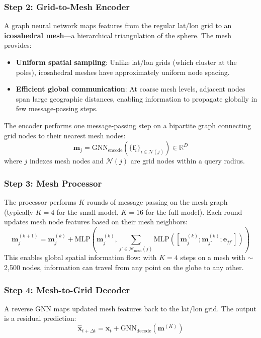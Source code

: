 \documentclass[11pt,a4paper]{article}
\begin{document}
\subsubsection{Step 2: Grid-to-Mesh Encoder}

A graph neural network maps features from the regular lat/lon grid to an \textbf{icosahedral mesh}---a hierarchical triangulation of the sphere. The mesh provides:
\begin{itemize}[nosep]
  \item \textbf{Uniform spatial sampling}: Unlike lat/lon grids (which cluster at the poles), icosahedral meshes have approximately uniform node spacing.
  \item \textbf{Efficient global communication}: At coarse mesh levels, adjacent nodes span large geographic distances, enabling information to propagate globally in few message-passing steps.
\end{itemize}

The encoder performs one message-passing step on a bipartite graph connecting grid nodes to their nearest mesh nodes:
\[
\mathbf{m}_j = \text{GNN}_\text{encode}\left(\{\mathbf{f}_i\}_{i \in \mathcal{N}(j)}\right) \in \mathbb{R}^D
\]
where $j$ indexes mesh nodes and $\mathcal{N}(j)$ are grid nodes within a query radius.

\subsubsection{Step 3: Mesh Processor}

The processor performs $K$ rounds of message passing on the mesh graph (typically $K{=}4$ for the small model, $K{=}16$ for the full model). Each round updates mesh node features based on their mesh neighbors:
\[
\mathbf{m}_j^{(k+1)} = \mathbf{m}_j^{(k)} + \text{MLP}\left(\mathbf{m}_j^{(k)}, \sum_{j' \in \mathcal{N}_\text{mesh}(j)} \text{MLP}([\mathbf{m}_j^{(k)}; \mathbf{m}_{j'}^{(k)}; \mathbf{e}_{jj'}])\right)
\]
This enables global spatial information flow: with $K{=}4$ steps on a mesh with $\sim$2,500 nodes, information can travel from any point on the globe to any other.

\subsubsection{Step 4: Mesh-to-Grid Decoder}

A reverse GNN maps updated mesh features back to the lat/lon grid. The output is a residual prediction:
\[
\hat{\mathbf{x}}_{t+\Delta t} = \mathbf{x}_t + \text{GNN}_\text{decode}(\mathbf{m}^{(K)})
\]
\end{document}
